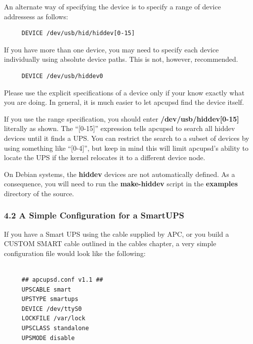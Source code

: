 An alternate way of specifying the device is to specify a range of device
addressess as follows: 

\footnotesize
\begin{verbatim}
     DEVICE /dev/usb/hid/hiddev[0-15]
\end{verbatim}
\normalsize

If you have more than one device, you may need to specify each device
individually using absolute device paths. This is not, however, recommended. 

\footnotesize
\begin{verbatim}
     DEVICE /dev/usb/hiddev0
\end{verbatim}
\normalsize

Please use the explicit specifications of a device only if your know exactly
what you are doing. In general, it is much easier to let apcupsd find the
device itself.  

If you use the range specification, you should enter {\bf
/dev/usb/hiddev[0-15]} literally as shown.  The ``[0-15]'' expression tells
apcupsd to search all hiddev devices until it finds a UPS. You can restrict
the search to a subset of devices by using something like ``[0-4]'', but keep
in mind this will limit apcupsd's ability to locate the UPS if the kernel
relocates it to a different device node.  

On Debian systems, the {\bf hiddev} devices are not automatically defined. As
a consequence, you will need to run the {\bf make-hiddev} script in the {\bf
examples} directory of the source. 

\label{A-Simple-Configuration-for-a-SmartUPS}

\subsubsection*{4.2 A Simple Configuration for a SmartUPS}

\label{index-Configuration_002c-SmartUPS-68}
\label{index-SmartUPS-configuration-69}
\label{index-Example_002c-SmartUPS-conf-70}
If you have a Smart UPS using the cable supplied by APC, or you build a CUSTOM
SMART cable outlined in the cables chapter, a very simple configuration file
would look like the following: 

\footnotesize
\begin{verbatim}
     
     ## apcupsd.conf v1.1 ##
     UPSCABLE smart
     UPSTYPE smartups
     DEVICE /dev/ttyS0
     LOCKFILE /var/lock
     UPSCLASS standalone
     UPSMODE disable
\end{verbatim}
\normalsize

